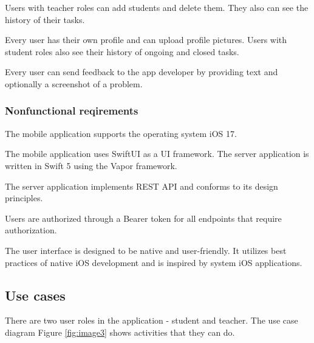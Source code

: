 \documentclass[
  biblatex = false,
  language=english,
  figures=false,
  sourcecodes,
  glossaries,
  index
]{kidiplom}
\begin{document}
Users with teacher roles can add students and delete them. They also can see the history of their tasks.

Every user has their own profile and can upload profile pictures. Users with student roles also see their history of ongoing and closed tasks.

Every user can send feedback to the app developer by providing text and optionally a screenshot of a problem.

\subsubsection{Nonfunctional reqirements}
The mobile application supports the operating system iOS 17.

The mobile application uses SwiftUI as a UI framework. The server application is written in Swift 5 using the Vapor framework.

The server application implements REST API and conforms to its design principles.

Users are authorized through a Bearer token for all endpoints that require authorization.

The user interface is designed to be native and user-friendly. It utilizes best practices of native iOS development and is inspired by system iOS applications.

\subsection{Use cases}

There are two user roles in the application - student and teacher. The use case diagram Figure \ref{fig:image3} shows activities that they can do.
\end{document}
